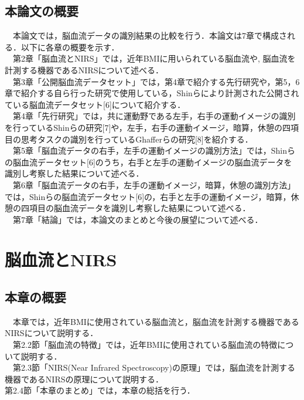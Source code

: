 \documentclass[a4j,12pt]{jreport}
\begin{document}
\section{本論文の概要}
　本論文では，脳血流データの識別結果の比較を行う．本論文は7章で構成される．以下に各章の概要を示す．\\
　第2章「脳血流とNIRS」では，近年BMIに用いられている脳血流や,  脳血流を計測する機器であるNIRSについて述べる．\\
　第3章「公開脳血流データセット」では，第4章で紹介する先行研究や，第5，6章で紹介する自ら行った研究で使用している，Shinらにより計測された公開されている脳血流データセット[6]について紹介する．\\
　第4章「先行研究」では，共に運動野である左手，右手の運動イメージの識別を行っているShinらの研究[7]や，左手，右手の運動イメージ，暗算，休憩の四項目の思考タスクの識別を行っているGhafferらの研究[8]を紹介する．\\
　第5章「脳血流データの右手，左手の運動イメージの識別方法」では，Shinらの脳血流データセット[6]のうち，右手と左手の運動イメージの脳血流データを識別し考察した結果について述べる．\\
　第6章「脳血流データの右手，左手の運動イメージ，暗算，休憩の識別方法」では，Shinらの脳血流データセット[6]の，右手と左手の運動イメージ，暗算，休憩の四項目の脳血流データを識別し考察した結果について述べる．\\
　第7章「結論」では，本論文のまとめと今後の展望について述べる．\\

\chapter{脳血流とNIRS}
\section{本章の概要}
　本章では，近年BMIに使用されている脳血流と，脳血流を計測する機器であるNIRSについて説明する．\\
　第2.2節「脳血流の特徴」では，近年BMIに使用されている脳血流の特徴について説明する．\\
　第2.3節「NIRS(Near Infrared Spectroscopy)の原理」では，脳血流を計測する機器であるNIRSの原理について説明する．\\
 第2.4節「本章のまとめ」では，本章の総括を行う．\\
\end{document}
